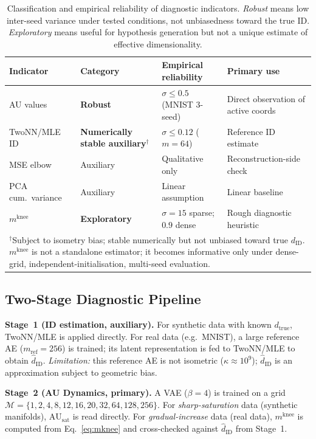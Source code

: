\documentclass[11pt,a4paper]{article}
\newcommand{\dID}{d_{\mathrm{ID}}}
\newcommand{\dtrue}{d_{\mathrm{true}}}
\newcommand{\kap}{\kappa}
\newcommand{\AUsat}{\mathrm{AU}_{\mathrm{sat}}}
\newcommand{\mknee}{m^{\mathrm{knee}}}
\newcommand{\hatdID}{\hat{d}_{\mathrm{ID}}}
\begin{document}
\begin{table}[ht]
\centering
\caption{Classification and empirical reliability of diagnostic indicators.
\emph{Robust} means low inter-seed variance under tested conditions, not unbiasedness toward the true ID.
\emph{Exploratory} means useful for hypothesis generation but not a unique estimate of effective dimensionality.}
\label{tab:indicator_class}
\small
\begin{tabularx}{\linewidth}{lXXX}
\toprule
Indicator & Category & Empirical reliability & Primary use \\
\midrule
AU values & \textbf{Robust} & $\sigma\!\leq\!0.5$ (MNIST 3-seed) & Direct observation of active coords \\
TwoNN/MLE ID & \textbf{Numerically stable auxiliary}$^\dagger$ & $\sigma\!\leq\!0.12$ ($m\!=\!64$) & Reference ID estimate \\
MSE elbow & Auxiliary & Qualitative only & Reconstruction-side check \\
PCA cum.\ variance & Auxiliary & Linear assumption & Linear baseline \\
$\mknee$ & \textbf{Exploratory} & $\sigma\!=\!15$ sparse; $0.9$ dense & Rough diagnostic heuristic \\
\bottomrule
\multicolumn{4}{p{0.97\linewidth}}{\footnotesize
$^\dagger$Subject to isometry bias; stable numerically but not unbiased toward true $\dID$.
$\mknee$ is not a standalone estimator; it becomes informative only under dense-grid,
independent-initialisation, multi-seed evaluation.}
\end{tabularx}
\end{table}

\subsection{Two-Stage Diagnostic Pipeline}\label{sec:framework_pipeline}

\textbf{Stage~1 (ID estimation, auxiliary).}
For synthetic data with known $\dtrue$, TwoNN/MLE is applied directly.
For real data (e.g.\ MNIST), a large reference AE ($m_{\mathrm{ref}}=256$) is
trained; its latent representation is fed to TwoNN/MLE to obtain $\hatdID$.
\emph{Limitation:} this reference AE is not isometric ($\kap\approx10^9$);
$\hatdID$ is an approximation subject to geometric bias.

\textbf{Stage~2 (AU Dynamics, primary).}
A VAE ($\beta=4$) is trained on a grid
$\mathcal{M}=\{1,2,4,8,12,16,20,32,64,128,256\}$.
For \emph{sharp-saturation} data (synthetic manifolds), $\AUsat$ is read directly.
For \emph{gradual-increase} data (real data), $\mknee$ is computed from
Eq.~\eqref{eq:mknee} and cross-checked against $\hatdID$ from Stage~1.
\end{document}

